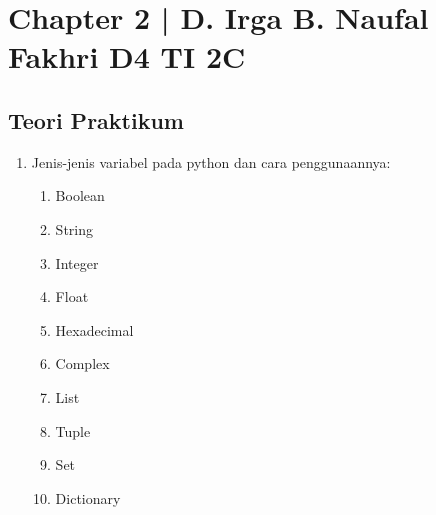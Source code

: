 \section{Chapter 2 | D. Irga B. Naufal Fakhri D4 TI 2C}
\subsection{Teori Praktikum}
\begin{enumerate}
\item Jenis-jenis variabel pada python dan cara penggunaannya:

\begin{enumerate}
\item Boolean


\item String


\item Integer


\item Float


\item Hexadecimal


\item Complex


\item List


\item Tuple


\item Set


\item Dictionary


\end{enumerate}


\end{enumerate}
